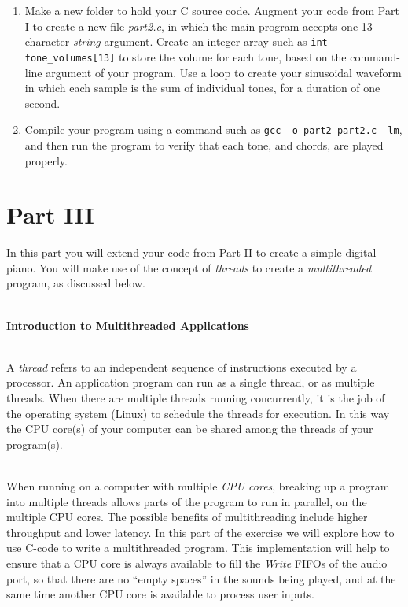\documentclass[epsfig,10pt,fullpage]{article}
\begin{document}
\begin{enumerate}
\item Make a new folder to hold your C source code. Augment your code from Part I to create a
new file {\it part2.c}, in which the main program accepts one 13-character {\it string} argument.
Create an integer array such as \texttt{int tone\_volumes[13]} to store the volume for
each tone, based on the command-line argument of your program. Use a loop to create your
sinusoidal waveform in which each sample is the sum of individual tones, for a duration of one
second.
\item Compile your program using a command such as \texttt{gcc -o part2 part2.c -lm}, 
and then run the program to verify that each tone, and chords, are played properly.
\end{enumerate}

\noindent
\section*{Part III}

In this part you will extend your code from Part II to create a simple digital piano. You
will make use of the concept of {\it threads} to create a {\it multithreaded} program, as
discussed below. 

~\\
\noindent
{\bf Introduction to Multithreaded Applications}

~\\
\noindent
A {\it thread} refers to an independent sequence of instructions executed by a processor. An 
application program can run as a single thread, or as multiple threads. When there are multiple
threads running concurrently, it is the job of the operating system (Linux) to schedule 
the threads for execution. In this way the CPU core(s) of your computer can be shared among the 
threads of your program(s).

~\\
\noindent
When running on a computer with multiple {\it CPU cores}, breaking up a program into
multiple threads allows parts of the program to run in parallel, on the multiple CPU cores.
The possible benefits of multithreading include higher throughput and lower latency. 
In this part of the exercise we will explore how to use C-code to write a
multithreaded program. This implementation will
help to ensure that a CPU core is always available to fill the {\it Write} FIFOs of the
audio port, so that there are no ``empty spaces'' in the sounds being played, and at the
same time another CPU core is available to process user inputs. 
\end{document}
